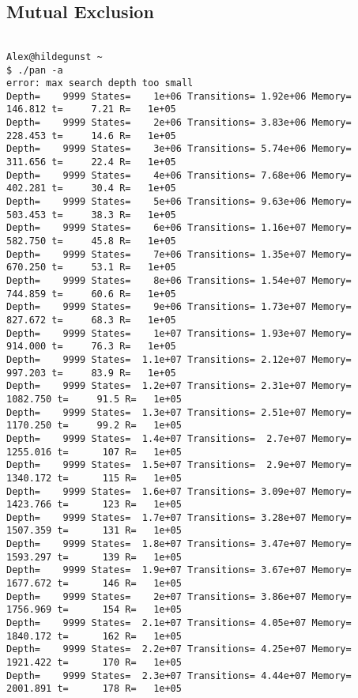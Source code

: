 \documentclass{llncs}
\begin{document}
\subsection{Mutual Exclusion \label{mc:app:unb:mutex}}


\begin{lstlisting}[frame=single]

Alex@hildegunst ~
$ ./pan -a
error: max search depth too small
Depth=    9999 States=    1e+06 Transitions= 1.92e+06 Memory=   146.812 t=     7.21 R=   1e+05
Depth=    9999 States=    2e+06 Transitions= 3.83e+06 Memory=   228.453 t=     14.6 R=   1e+05
Depth=    9999 States=    3e+06 Transitions= 5.74e+06 Memory=   311.656 t=     22.4 R=   1e+05
Depth=    9999 States=    4e+06 Transitions= 7.68e+06 Memory=   402.281 t=     30.4 R=   1e+05
Depth=    9999 States=    5e+06 Transitions= 9.63e+06 Memory=   503.453 t=     38.3 R=   1e+05
Depth=    9999 States=    6e+06 Transitions= 1.16e+07 Memory=   582.750 t=     45.8 R=   1e+05
Depth=    9999 States=    7e+06 Transitions= 1.35e+07 Memory=   670.250 t=     53.1 R=   1e+05
Depth=    9999 States=    8e+06 Transitions= 1.54e+07 Memory=   744.859 t=     60.6 R=   1e+05
Depth=    9999 States=    9e+06 Transitions= 1.73e+07 Memory=   827.672 t=     68.3 R=   1e+05
Depth=    9999 States=    1e+07 Transitions= 1.93e+07 Memory=   914.000 t=     76.3 R=   1e+05
Depth=    9999 States=  1.1e+07 Transitions= 2.12e+07 Memory=   997.203 t=     83.9 R=   1e+05
Depth=    9999 States=  1.2e+07 Transitions= 2.31e+07 Memory=  1082.750 t=     91.5 R=   1e+05
Depth=    9999 States=  1.3e+07 Transitions= 2.51e+07 Memory=  1170.250 t=     99.2 R=   1e+05
Depth=    9999 States=  1.4e+07 Transitions=  2.7e+07 Memory=  1255.016 t=      107 R=   1e+05
Depth=    9999 States=  1.5e+07 Transitions=  2.9e+07 Memory=  1340.172 t=      115 R=   1e+05
Depth=    9999 States=  1.6e+07 Transitions= 3.09e+07 Memory=  1423.766 t=      123 R=   1e+05
Depth=    9999 States=  1.7e+07 Transitions= 3.28e+07 Memory=  1507.359 t=      131 R=   1e+05
Depth=    9999 States=  1.8e+07 Transitions= 3.47e+07 Memory=  1593.297 t=      139 R=   1e+05
Depth=    9999 States=  1.9e+07 Transitions= 3.67e+07 Memory=  1677.672 t=      146 R=   1e+05
Depth=    9999 States=    2e+07 Transitions= 3.86e+07 Memory=  1756.969 t=      154 R=   1e+05
Depth=    9999 States=  2.1e+07 Transitions= 4.05e+07 Memory=  1840.172 t=      162 R=   1e+05
Depth=    9999 States=  2.2e+07 Transitions= 4.25e+07 Memory=  1921.422 t=      170 R=   1e+05
Depth=    9999 States=  2.3e+07 Transitions= 4.44e+07 Memory=  2001.891 t=      178 R=   1e+05

\end{lstlisting}
\end{document}

